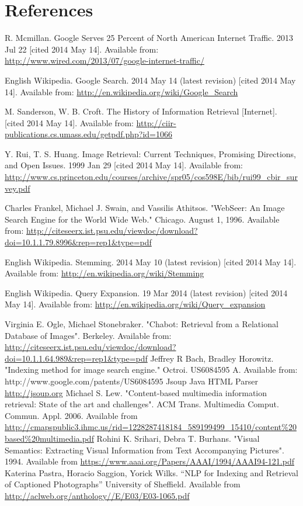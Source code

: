 \documentclass[a4paper]{article}
\begin{document}
\section{References}

\begin{thebibliography}{99}

R. Mcmillan. Google Serves 25 Percent of North American Internet Traffic. 2013 Jul 22 [cited 2014 May 14]. Available from: \url{http://www.wired.com/2013/07/google-internet-traffic/}

English Wikipedia. Google Search. 2014 May 14 (latest revision) [cited 2014 May 14]. Available from: \url{http://en.wikipedia.org/wiki/Google_Search}

M. Sanderson, W. B. Croft. The History of Information Retrieval [Internet].  [cited 2014 May 14]. Available from: \url{http://ciir-publications.cs.umass.edu/getpdf.php?id=1066}

Y. Rui, T. S. Huang. Image Retrieval: Current Techniques, Promising Directions, and Open Issues. 1999 Jan 29 [cited 2014 May 14]. Available from: \url{http://www.cs.princeton.edu/courses/archive/spr05/cos598E/bib/rui99_cbir_survey.pdf}

Charles Frankel, Michael J. Swain, and Vassilis Athitsos. "WebSeer: An Image Search Engine for the World Wide Web." Chicago. August 1, 1996. Available from: \url{http://citeseerx.ist.psu.edu/viewdoc/download?doi=10.1.1.79.8996&rep=rep1&type=pdf} 

English Wikipedia. Stemming. 2014 May 10 (latest revision) [cited 2014 May 14]. Available from: \url{http://en.wikipedia.org/wiki/Stemming}

 English Wikipedia. Query Expansion. 19 Mar 2014 (latest revision) [cited 2014 May 14]. Available from: \url{http://en.wikipedia.org/wiki/Query_expansion}

Virginia E. Ogle, Michael Stonebraker. "Chabot: Retrieval from a Relational Database of Images". Berkeley. Available from: \url{http://citeseerx.ist.psu.edu/viewdoc/download?doi=10.1.1.64.989&rep=rep1&type=pdf}
Jeffrey R Bach, Bradley Horowitz. "Indexing method for image search engine." Octroi. US6084595 A. Available from: {http://www.google.com/patents/US6084595}
Jsoup Java HTML Parser \url{http://jsoup.org}
Michael S. Lew. "Content-based multimedia information retrieval: State of the art and challenges". ACM Trans. Multimedia Comput. Commun. Appl. 2006. Available from \url{http://cmapspublic3.ihmc.us/rid=1228287418184_589199499_15410/content%20based%20multimedia.pdf}
Rohini K. Srihari, Debra T. Burhans. "Visual Semantics: Extracting Visual Information from Text Accompanying Pictures". 1994. Available from \url{https://www.aaai.org/Papers/AAAI/1994/AAAI94-121.pdf}
Katerina Pastra, Horacio Saggion, Yorick Wilks. “NLP for Indexing and Retrieval of Captioned Photographs” University of Sheffield. Available from \url{http://aclweb.org/anthology//E/E03/E03-1065.pdf}




\end{thebibliography}
\end{document}

